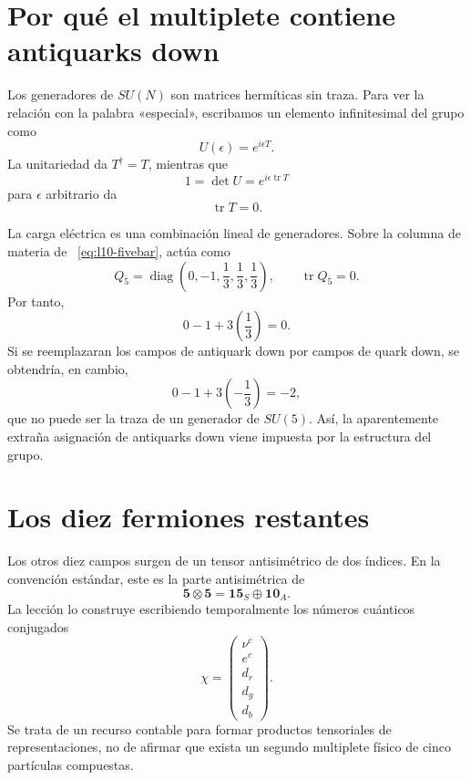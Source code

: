 \section{Por qué el multiplete contiene antiquarks down}

Los generadores de \(SU(N)\) son matrices hermíticas sin traza. Para ver la relación con la palabra «especial», escribamos un elemento infinitesimal del grupo como
\begin{equation}
U(\epsilon)=e^{i\epsilon T}.
\end{equation}
La unitariedad da \(T^\dagger=T\), mientras que
\begin{equation}
1=\det U=e^{i\epsilon\operatorname{tr}T}
\end{equation}
para \(\epsilon\) arbitrario da
\begin{equation}
\operatorname{tr}T=0.
\label{eq:l10-traceless-generator}
\end{equation}

La carga eléctrica es una combinación lineal de generadores. Sobre la columna de materia de ~\eqref{eq:l10-fivebar}, actúa como
\begin{equation}
Q_{\overline5}
=
\operatorname{diag}
\left(0,-1,\frac13,\frac13,\frac13\right),
\qquad
\operatorname{tr}Q_{\overline5}=0.
\label{eq:l10-charge-fivebar}
\end{equation}
Por tanto,
\begin{equation}
0-1+3\left(\frac13\right)=0.
\end{equation}
Si se reemplazaran los campos de antiquark down por campos de quark down, se obtendría, en cambio,
\begin{equation}
0-1+3\left(-\frac13\right)=-2,
\end{equation}
que no puede ser la traza de un generador de \(SU(5)\). Así, la aparentemente extraña asignación de antiquarks down viene impuesta por la estructura del grupo.

\section{Los diez fermiones restantes}

Los otros diez campos surgen de un tensor antisimétrico de dos índices. En la convención estándar, este es la parte antisimétrica de
\begin{equation}
\mathbf5\otimes\mathbf5
=\mathbf{15}_S\oplus\mathbf{10}_A.
\label{eq:l10-five-five}
\end{equation}
La lección lo construye escribiendo temporalmente los números cuánticos conjugados
\begin{equation}
\chi=
\begin{pmatrix}
\nu^c\\
e^c\\
d_r\\
d_g\\
d_b
\end{pmatrix}.
\label{eq:l10-aux-five}
\end{equation}
Se trata de un recurso contable para formar productos tensoriales de representaciones, no de afirmar que exista un segundo multiplete físico de cinco partículas compuestas.

